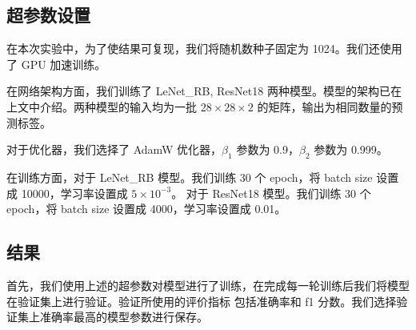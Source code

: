 \documentclass[supercite]{Experimental_Report}
\theoremstyle{definition}
\begin{document}
\subsection{超参数设置}
在本次实验中，为了使结果可复现，我们将随机数种子固定为 1024。我们还使用了 GPU 加速训练。

在网络架构方面，我们训练了 LeNet\_RB, ResNet18 两种模型。模型的架构已在上文中介绍。两种模型的输入均为一批 $28\times 28\times 2$
的矩阵，输出为相同数量的预测标签。

对于优化器，我们选择了 AdamW 优化器，$\beta_1$ 参数为 0.9，$\beta_2$ 参数为 0.999。

在训练方面，对于 LeNet\_RB 模型。我们训练 30 个 epoch，将 batch size 设置成 10000，学习率设置成 $5\times 10^{-3}$。
对于 ResNet18 模型。我们训练 30 个 epoch，将 batch size 设置成 4000，学习率设置成 0.01。

\subsection{结果}
首先，我们使用上述的超参数对模型进行了训练，在完成每一轮训练后我们将模型在验证集上进行验证。验证所使用的评价指标
包括准确率和 f1 分数。我们选择验证集上准确率最高的模型参数进行保存。
\end{document}
